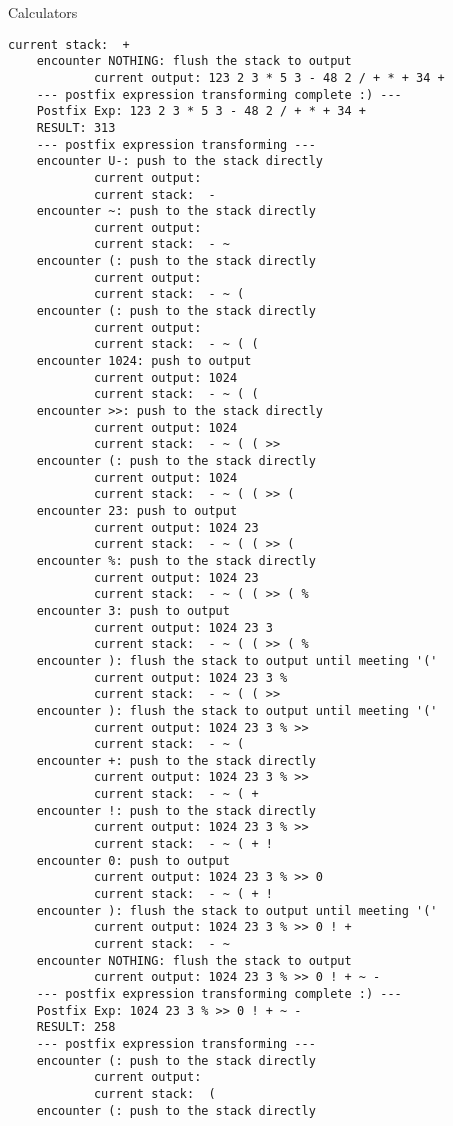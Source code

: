 \begin{homeworkProblem}{Calculators}
\begin{lstlisting}[breaklines=true]
            current stack:  +
    encounter NOTHING: flush the stack to output
            current output: 123 2 3 * 5 3 - 48 2 / + * + 34 +
    --- postfix expression transforming complete :) ---
    Postfix Exp: 123 2 3 * 5 3 - 48 2 / + * + 34 +
    RESULT: 313
    --- postfix expression transforming ---
    encounter U-: push to the stack directly
            current output:
            current stack:  -
    encounter ~: push to the stack directly
            current output:
            current stack:  - ~
    encounter (: push to the stack directly
            current output:
            current stack:  - ~ (
    encounter (: push to the stack directly
            current output:
            current stack:  - ~ ( (
    encounter 1024: push to output
            current output: 1024
            current stack:  - ~ ( (
    encounter >>: push to the stack directly
            current output: 1024
            current stack:  - ~ ( ( >>
    encounter (: push to the stack directly
            current output: 1024
            current stack:  - ~ ( ( >> (
    encounter 23: push to output
            current output: 1024 23
            current stack:  - ~ ( ( >> (
    encounter %: push to the stack directly
            current output: 1024 23
            current stack:  - ~ ( ( >> ( %
    encounter 3: push to output
            current output: 1024 23 3
            current stack:  - ~ ( ( >> ( %
    encounter ): flush the stack to output until meeting '('
            current output: 1024 23 3 %
            current stack:  - ~ ( ( >>
    encounter ): flush the stack to output until meeting '('
            current output: 1024 23 3 % >>
            current stack:  - ~ (
    encounter +: push to the stack directly
            current output: 1024 23 3 % >>
            current stack:  - ~ ( +
    encounter !: push to the stack directly
            current output: 1024 23 3 % >>
            current stack:  - ~ ( + !
    encounter 0: push to output
            current output: 1024 23 3 % >> 0
            current stack:  - ~ ( + !
    encounter ): flush the stack to output until meeting '('
            current output: 1024 23 3 % >> 0 ! +
            current stack:  - ~
    encounter NOTHING: flush the stack to output
            current output: 1024 23 3 % >> 0 ! + ~ -
    --- postfix expression transforming complete :) ---
    Postfix Exp: 1024 23 3 % >> 0 ! + ~ -
    RESULT: 258
    --- postfix expression transforming ---
    encounter (: push to the stack directly
            current output:
            current stack:  (
    encounter (: push to the stack directly

\end{lstlisting}
\end{homeworkProblem}
